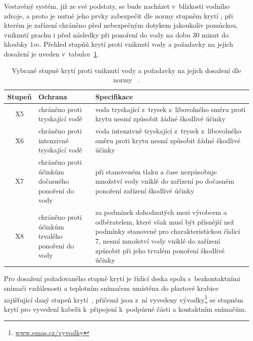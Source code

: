         Vestavěný systém, již ze své podstaty, se bude nacházet v~blízkosti vodního zdroje, a proto je nutné jeho prvky zabezpečit dle normy  stupněm krytí , při kterém je zařízení chráněno před nebezpečným dotykem jakoukoliv pomůckou, vniknutí prachu i před následky při ponoření do vody na dobu 30 minut do hloubky $1\unit{m}$. Přehled stupňů krytí proti vniknutí vody a požadavky na jejich dosažení je uveden v~tabulce~\ref{table:ip}.

        \begin{table}[h]\centering
            \begin{tabular}{@{}cp{4cm}p{8.5cm}@{}}
                \toprule
                Stupeň & Ochrana & Specifikace\\
                \midrule
                X5 & chráněno proti tryskající vodě & voda tryskající z~trysek z~libovolného směru proti krytu nesmí způsobit žádné škodlivé účinky\\
                X6 & chráněno proti intenzivně tryskající vodě & voda intenzivně tryskající z~trysek z~libovolného směru proti krytu nesmí způsobit žádné škodlivé účinky\\
                X7 & chráněno proti účinkům dočasného ponoření do vody & při stanoveném tlaku a čase nezpůsobuje množství vody vniklé do zařízení po dočasném ponoření zařízení škodlivé účinky\\
                X8 & chráněno proti účinkům trvalého ponoření do vody & za podmínek dohodnutých mezi výrobcem a odběratelem, které však musí být přísnější než podmínky stanovené pro charakteristickou číslici 7, nesmí množství vody vniklé do zařízení způsobit při jeho trvalém ponoření škodlivé účinky\\
                \bottomrule
            \end{tabular}
            \caption{Vybrané stupně krytí proti vniknutí vody a požadavky na jejich dosažení dle normy ~\cite{esp:at}.}
            \label{table:ip}
        \end{table}

        Pro dosažení požadovaného stupně krytí  je řídicí deska spolu s~bezkontaktními snímači vzdálenosti a teplotním snímačem umístěna do plastové krabice  zajišťující daný stupeň krytí~\cite{krabice}, přičemž jsou z~ní vyvedeny vývodky\footnote{\url{www.emas.cz/vyvodky}} se stupněm krytí  pro vyvedení kabelů k~připojení k~podpůrné části a kontaktním snímačům.

